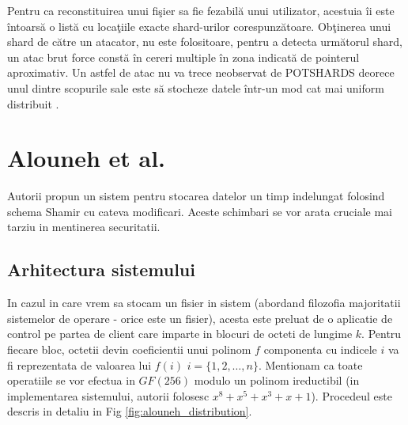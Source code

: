 \documentclass{llncs}
\newcommand{\todo}[1]{{\color{red}{TODO #1}}}
\begin{document}
Pentru ca reconstituirea unui fi\c{s}ier sa fie fezabil\u{a} unui utilizator, acestuia \^{i}i este \^{i}ntoars\u{a} o list\u{a} cu loca\c{t}iile exacte shard-urilor corespunz\u{a}toare.
Ob\c{t}inerea unui shard de c\u{a}tre un atacator, nu este folositoare, pentru a detecta urm\u{a}torul shard, un atac brut force const\u{a} \^{i}n cereri multiple \^{i}n zona indicat\u{a} de pointerul aproximativ. Un astfel de atac nu va trece neobservat de POTSHARDS deorece unul dintre scopurile sale este s\u{a} stocheze datele \^{i}ntr-un mod cat mai uniform distribuit \todo{spread}.\cite{SGMV:2009}

\section{Alouneh et al.}
\label{desc_alouneh}

Autorii propun un sistem pentru stocarea datelor un timp indelungat folosind schema Shamir cu cateva modificari. Aceste schimbari se vor arata cruciale mai tarziu in mentinerea securitatii.

\subsection{Arhitectura sistemului}
In cazul in care vrem sa stocam un fisier in sistem (abordand filozofia majoritatii sistemelor de operare - orice este un fisier), acesta este preluat de o aplicatie de control pe partea de client care imparte in blocuri de octeti de lungime $k$. Pentru fiecare bloc, octetii devin coeficientii unui polinom $f$ componenta cu indicele $i$ va fi reprezentata de valoarea lui $f(i)$ $i = \{1,2,\dots, n\}$. Mentionam ca toate operatiile se vor efectua in $GF(256)$ modulo un polinom ireductibil (in implementarea sistemului, autorii folosesc $x^8 + x^5 + x^3 + x + 1$). Procedeul este descris in detaliu in Fig \ref{fig:alouneh_distribution}.
\end{document}
